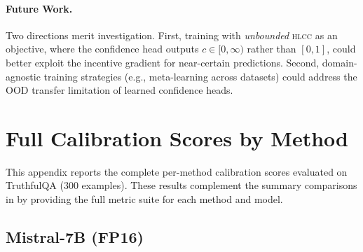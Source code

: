 \documentclass[11pt,a4paper]{article}
\newcommand{\hlcc}{\textsc{hlcc}}
\begin{document}
\paragraph{Future Work.}
Two directions merit investigation.  First, training with
\emph{unbounded} \hlcc{} as an objective, where the confidence head
outputs $c \in [0, \infty)$ rather than $[0,1]$, could better
exploit the incentive gradient for near-certain predictions.  Second,
domain-agnostic training strategies (e.g., meta-learning across
datasets) could address the OOD transfer limitation of learned
confidence heads.


\appendix

\section{Full Calibration Scores by Method}
\label{app:calibration-scores}

This appendix reports the complete per-method calibration scores
evaluated on TruthfulQA (300 examples).  These results complement
the summary comparisons in  by providing the
full metric suite for each method and model.

\subsection{Mistral-7B (FP16)}
\label{app:calibration-mistral-7b}
\end{document}

